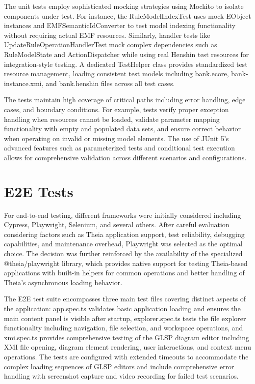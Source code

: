 The unit tests employ sophisticated mocking strategies using Mockito to isolate components under test. For instance, the RuleModelIndexTest uses mock EObject instances and EMFSemanticIdConverter to test model indexing functionality without requiring actual EMF resources. Similarly, handler tests like UpdateRuleOperationHandlerTest mock complex dependencies such as RuleModelState and ActionDispatcher while using real Henshin test resources for integration-style testing. A dedicated TestHelper class provides standardized test resource management, loading consistent test models including bank.ecore, bank-instance.xmi, and bank.henshin files across all test cases.

The tests maintain high coverage of critical paths including error handling, edge cases, and boundary conditions. For example, tests verify proper exception handling when resources cannot be loaded, validate parameter mapping functionality with empty and populated data sets, and ensure correct behavior when operating on invalid or missing model elements. The use of JUnit 5's advanced features such as parameterized tests and conditional test execution allows for comprehensive validation across different scenarios and configurations.

  \section{E2E Tests}
  \label{subsec:performance-evaluation}

For end-to-end testing, different frameworks were initially considered including Cypress, Playwright, Selenium, and several others. After careful evaluation considering factors such as Theia application support, test reliability, debugging capabilities, and maintenance overhead, Playwright was selected as the optimal choice. The decision was further reinforced by the availability of the specialized @theia/playwright library, which provides native support for testing Theia-based applications with built-in helpers for common operations and better handling of Theia's asynchronous loading behavior.

The E2E test suite encompasses three main test files covering distinct aspects of the application: app.spec.ts validates basic application loading and ensures the main content panel is visible after startup, explorer.spec.ts tests the file explorer functionality including navigation, file selection, and workspace operations, and xmi.spec.ts provides comprehensive testing of the GLSP diagram editor including XMI file opening, diagram element rendering, user interactions, and context menu operations. The tests are configured with extended timeouts to accommodate the complex loading sequences of GLSP editors and include comprehensive error handling with screenshot capture and video recording for failed test scenarios.

